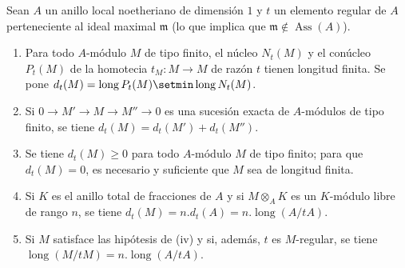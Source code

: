 \begin{lemma}[21.10.13]
\label{IV.21.10.13}
Sean $A$ un anillo local noetheriano de dimensión $1$ y $t$ un elemento regular de $A$ perteneciente al ideal maximal $\mathfrak{m}$ (lo que implica que $\mathfrak{m}\notin\operatorname{Ass}(A)$).
\begin{enumerate}[label=\textup{(\roman*)}]
  \item Para todo $A$-módulo $M$ de tipo finito, el núcleo $N_t(M)$ y el conúcleo $P_t(M)$ de la homotecia $t_M:M\to M$ de razón $t$ tienen longitud finita. Se pone $d_t(M)=\operatorname{long}P_t(M)\setmin\operatorname{long}N_t(M)$.
  \item Si $0\to M'\to M\to M''\to0$ es una sucesión exacta de $A$-módulos de tipo finito, se tiene $d_t(M)=d_t(M')+d_t(M'')$.
  \item Se tiene $d_t(M)\geq0$ para todo $A$-módulo $M$ de tipo finito; para que $d_t(M)=0$, es necesario y suficiente que $M$ sea de longitud finita.
  \item Si $K$ es el anillo total de fracciones de $A$ y si $M\otimes_AK$ es un $K$-módulo libre de rango $n$, se tiene $d_t(M)=n.d_t(A)=n.\operatorname{long}(A/tA)$.
  \item Si $M$ satisface las hipótesis de \textup{(iv)} y si, además, $t$ es $M$-regular, se tiene $\operatorname{long}(M/tM)=n.\operatorname{long}(A/tA)$.
\end{enumerate}
\end{lemma}

